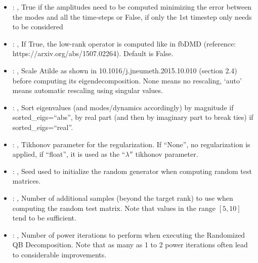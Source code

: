 \begin{itemize}
    \item {}: , 
      True if the amplitudes need to be computed minimizing the error
      between the modes and all the time-steps or False, if only the 1st timestep only needs to be
      considered

    \item {}: , 
      If True, the low-rank operator is computed like in fbDMD (reference:
      https://arxiv.org/abs/1507.02264).                                                  Default is
      False.

    \item {}: , 
      Scale Atilde as shown in 10.1016/j.jneumeth.2015.10.010 (section 2.4) before computing its
      eigendecomposition. None means no rescaling, ‘auto’ means automatic rescaling using singular
      values.

    \item {}: , 
      Sort eigenvalues (and modes/dynamics accordingly) by magnitude if sorted\_eigs=``abs'',
      by real part (and then by imaginary part to break ties) if sorted\_eigs=``real''.

    \item {}: , 
      Tikhonov parameter for the regularization.                                                  If
      ``None'', no regularization is applied, if ``float'', it is used as the
      ``$\lambda''$ tikhonov parameter.

    \item {}: , 
      Seed used to initialize the random generator when computing random test matrices.

    \item {}: , 
      Number of additional samples (beyond the target rank) to use when computing the
      random test matrix. Note that values in the range $[5, 10]$ tend to be sufficient.

    \item {}: , 
      Number of power iterations to perform when executing the Randomized QB Decomposition.
      Note that as many as 1 to 2 power iterations often lead to considerable improvements.
  \end{itemize}

